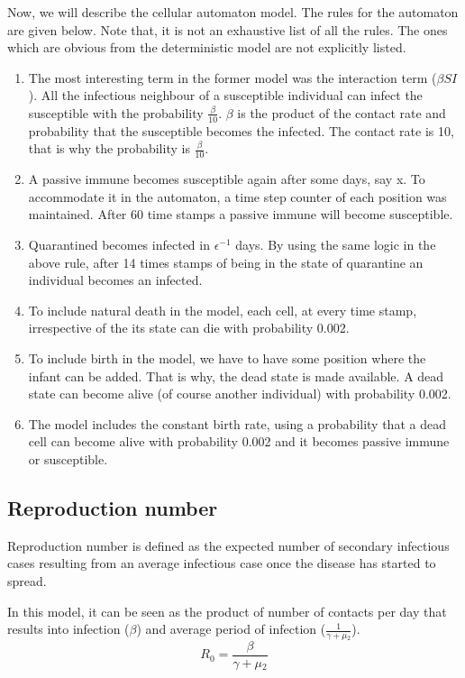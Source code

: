 \documentclass[prl,12pt,citeautoscript,reprint]{revtex4-1}
\begin{document}
\par Now, we will describe the cellular automaton model. The rules for the automaton are given below. Note that, it is not an exhaustive list of all the rules. The ones which are obvious from the deterministic model are not explicitly listed.
\begin{enumerate}
    \item The most interesting term in the former model was the interaction term ($\beta SI$). All the infectious neighbour of a susceptible individual can infect the susceptible with the probability $ \frac{\beta}{10}$. $\beta$ is the product of the contact rate and probability that the susceptible becomes the infected. The contact rate is 10, that is why the probability is $\frac{\beta}{10}$.
    \item A passive immune becomes susceptible again after some days, say x. To accommodate it in the automaton, a time step counter of each position was maintained. After 60 time stamps a passive immune will become susceptible.
    \item Quarantined becomes infected in $\epsilon^{-1}$ days. By using the same logic in the above rule, after 14 times stamps of being in the state of quarantine an individual becomes an infected.
    \item To include natural death in the model, each cell, at every time stamp, irrespective of the its state can die with probability 0.002.
    \item To include birth in the model, we have to have some position where the infant can be added. That is why, the dead state is made available. A dead state can become alive (of course another individual) with probability 0.002.
    \item The model includes the constant birth rate, using a probability that a dead cell can become alive with probability 0.002 and it becomes passive immune or susceptible. 
\end{enumerate}
\subsection{Reproduction number}
Reproduction number is defined as the expected number of secondary infectious cases resulting from an average infectious case once the disease has started to spread. 

In this model, it can be seen as the product of number of contacts per day that results into infection (${\beta}$) and average period of infection ($\frac{1}{\gamma + \mu{_2}}$). 
$$R{_0} = \frac{\beta}{\gamma + \mu{_2}}$$
\end{document}

